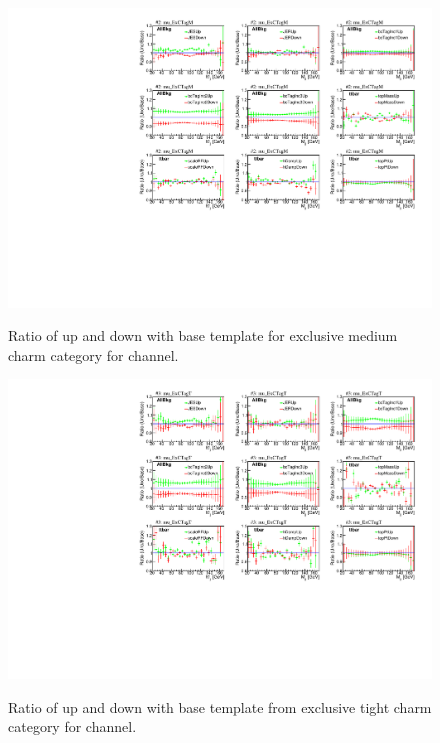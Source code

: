 \begin{figure}
    \centering
    {\includegraphics[width=0.95\linewidth]{Image/SYS/RatioBaseSys/mjj_2_mu_ExCTagM.pdf}}
    \caption{ Ratio of up and down with base template for exclusive medium charm category for \mujets channel.}
    \label{fig:shapeVslnN2}
\end{figure}
\begin{figure}
    \centering
    {\includegraphics[width=0.95\linewidth]{Image/SYS/RatioBaseSys/mjj_3_mu_ExCTagT.pdf}}
    \caption{ Ratio of up and down with base template from  exclusive tight charm category for \mujets channel. }
    \label{fig:shapeVslnN3}
\end{figure}


